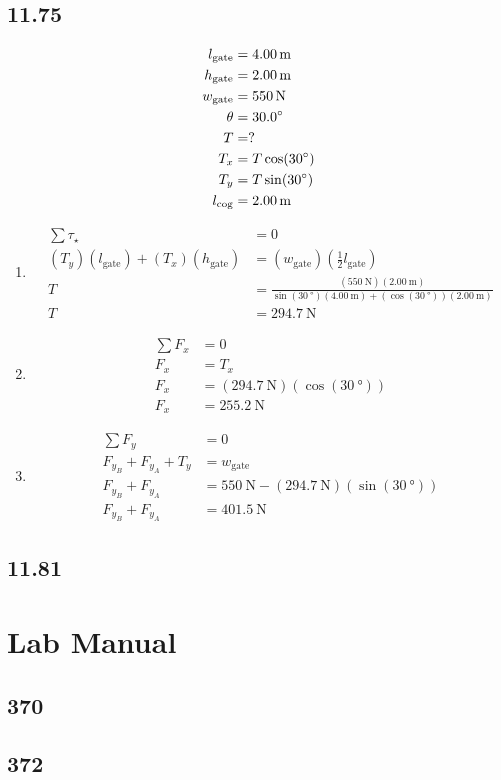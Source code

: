 \documentclass{article}
\begin{document}
\subsection{11.75}
\begin{align*}
	l_\text{gate} & = \SI{4.00}{\meter} \\
	h_\text{gate} & = \SI{2.00}{\meter} \\
	w_\text{gate} & = \SI{550}{\newton} \\
	\theta & = \SI{30.0}{\degree} \\
	T & = ? \\
	T_x & = T\cos(30\degree) \\
	T_y & = T\sin(30\degree) \\
	l_\text{cog} & = \SI{2.00}{\meter}
\end{align*}
\begin{enumerate}[label=\textbf{(\alph*)}]
	\item
		\begin{align*}
			\sum \tau_\star & = 0 \\
			(T_y)(l_\text{gate}) + (T_x)(h_\text{gate}) & = (w_\text{gate})\left(\frac{1}{2}l_\text{gate}\right) \\
			T & = \frac{(\SI{550}{\newton})(\SI{2.00}{\meter})}{\sin(\SI{30}{\degree})(\SI{4.00}{\meter}) + (\cos(\SI{30}{\degree}))(\SI{2.00}{\meter})} \\
			T & = \SI{294.7}{\newton}
		\end{align*}
	\item
		\begin{align*}
			\sum F_x & = 0 \\
			F_x & = T_x \\
			F_x & = (\SI{294.7}{\newton})(\cos(\SI{30}{\degree})) \\
			F_x & = \SI{255.2}{\newton}
		\end{align*}
	\item
		\begin{align*}
			\sum F_y & = 0 \\
			F_{y_B} + F_{y_A} + T_y & = w_\text{gate} \\
			F_{y_B} + F_{y_A} & = \SI{550}{\newton} - (\SI{294.7}{\newton})(\sin(\SI{30}{\degree})) \\
			F_{y_B} + F_{y_A} & = \SI{401.5}{\newton}
		\end{align*}
\end{enumerate}

\subsection{11.81}

\section{Lab Manual}

\subsection{370}

\subsection{372}
\end{document}
